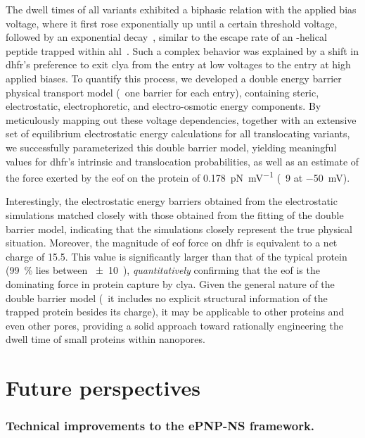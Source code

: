 The dwell times of all \DHFRt{} variants exhibited a biphasic relation with the applied bias voltage, where it
first rose exponentially up until a certain threshold voltage, followed by an exponential
decay~\cite{Biesemans-2015}, similar to the escape rate of an \ta-helical peptide trapped within
\gls{ahl}~\cite{Movileanu-2005}. Such a complex behavior was explained by a shift in \gls{dhfr}'s preference
to exit \gls{clya} from the \cisi{} entry at low voltages to the \transi{} entry at high applied biases. To
quantify this process, we developed a double energy barrier physical transport model (\ie~one barrier for each
entry), containing steric, electrostatic, electrophoretic, and electro-osmotic energy components. By
meticulously mapping out these voltage dependencies, together with an extensive set of equilibrium
electrostatic energy calculations for all translocating \DHFRt{} variants, we successfully parameterized this
double barrier model, yielding meaningful values for \gls{dhfr}'s intrinsic \cisi{} and \transi{}
translocation probabilities, as well as an estimate of the force exerted by the \gls{eof} on the protein of
\SI{0.178}{\pico\newton\per\milli\volt} (\eg~\SI{9}{\pN} at \SI{-50}{\mV}).

Interestingly, the electrostatic energy barriers obtained from the electrostatic simulations matched closely
with those obtained from the fitting of the double barrier model, indicating that the simulations closely
represent the true physical situation. Moreover, the magnitude of \gls{eof} force on \gls{dhfr} is equivalent
to a net charge of \SI{+15.5}{\ec}. This value is significantly larger than that of the typical protein
(\SI{99}{\percent} lies between \SI{\pm10}{\ec}~\cite{Requiao-2017}), \emph{quantitatively} confirming that
the \gls{eof} is the dominating force in protein capture by \gls{clya}. Given the general nature of the double
barrier model (\ie~it includes no explicit structural information of the trapped protein besides its charge),
it may be applicable to other proteins and even other pores, providing a solid approach toward rationally
engineering the dwell time of small proteins within nanopores.



%
\section{Future perspectives}
%
\label{sec:con:perspectives}
%

\subsubsection{Technical improvements to the {ePNP-NS} framework.}
%

